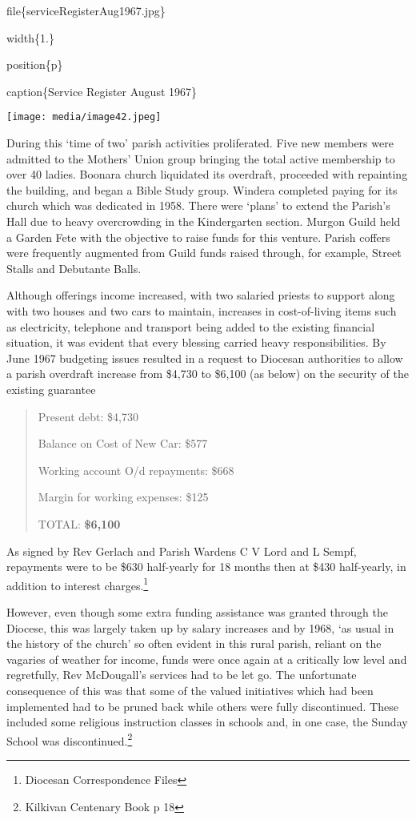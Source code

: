 file\{serviceRegisterAug1967.jpg\}

width\{1.\}

position\{p\}

caption\{Service Register August 1967\}

\texttt{[image: media/image42.jpeg]}

During this `time of two' parish activities proliferated. Five new members were admitted to the Mothers' Union group bringing the total active membership to over 40 ladies. Boonara church liquidated its overdraft, proceeded with repainting the building, and began a Bible Study group. Windera completed paying for its church which was dedicated in 1958. There were `plans' to extend the Parish's Hall due to heavy overcrowding in the Kindergarten section. Murgon Guild held a Garden Fete with the objective to raise funds for this venture. Parish coffers were frequently augmented from Guild funds raised through, for example, Street Stalls and Debutante Balls.

Although offerings income increased, with two salaried priests to support along with two houses and two cars to maintain, increases in cost-of-living items such as electricity, telephone and transport being added to the existing financial situation, it was evident that every blessing carried heavy responsibilities. By June 1967 budgeting issues resulted in a request to Diocesan authorities to allow a parish overdraft increase from \$4,730 to \$6,100 (as below) on the security of the existing guarantee

\begin{quote}
Present debt: \$4,730

Balance on Cost of New Car: \$577

Working account O/d repayments: \$668

Margin for working expenses: \$125

TOTAL: \textbf{\$6,100}
\end{quote}

As signed by Rev Gerlach and Parish Wardens C V Lord and L Sempf, repayments were to be \$630 half-yearly for 18 months then at \$430 half-yearly, in addition to interest charges.\footnote{Diocesan Correspondence Files}

However, even though some extra funding assistance was granted through the Diocese, this was largely taken up by salary increases and by 1968, `as usual in the history of the church' so often evident in this rural parish, reliant on the vagaries of weather for income, funds were once again at a critically low level and regretfully, Rev McDougall's services had to be let go. The unfortunate consequence of this was that some of the valued initiatives which had been implemented had to be pruned back while others were fully discontinued. These included some religious instruction classes in schools and, in one case, the Sunday School was discontinued.\footnote{Kilkivan Centenary Book p 18}


